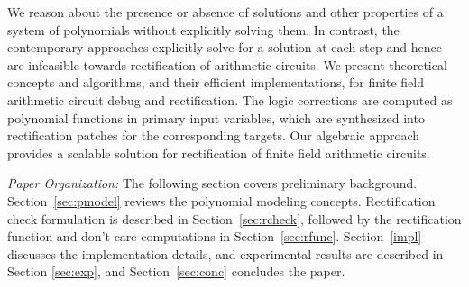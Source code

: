 

 

 



{\red We reason about the presence or absence of solutions 
and other properties of a system of polynomials without explicitly solving them. 
In contrast, the contemporary approaches explicitly solve for a solution at 
each step and hence are infeasible towards rectification of arithmetic circuits.
We present theoretical concepts and algorithms, and their efficient implementations, 
for finite field arithmetic circuit debug and rectification. The logic corrections 
are computed as polynomial functions in primary input variables, which are synthesized 
into rectification patches for the corresponding targets. 
Our algebraic approach provides a scalable solution for rectification
of finite field arithmetic circuits.}

{\it Paper Organization:} The following section covers preliminary
background. Section~\ref{sec:pmodel} reviews the polynomial modeling
concepts. Rectification check formulation is described in
Section~\ref{sec:rcheck}, followed by the rectification function and
don't care computations in Section~\ref{sec:rfunc}. Section~\ref{impl}
discusses the implementation details, and experimental
results are described in Section \ref{sec:exp}, and
Section~\ref{sec:conc} concludes the paper. 